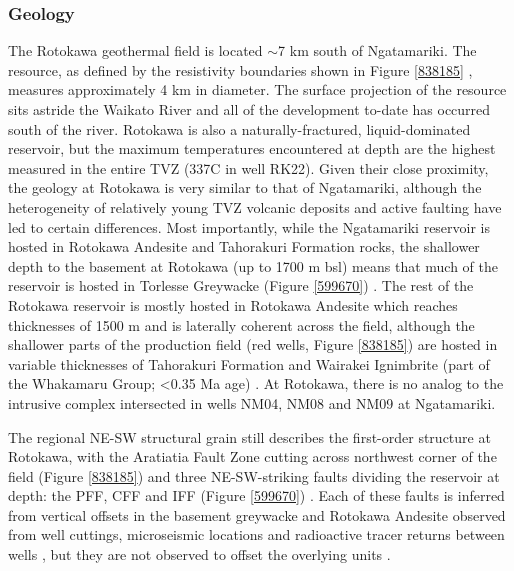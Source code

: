 \subsubsection{Geology}
The Rotokawa geothermal field is located $\sim$7 km south of Ngatamariki. The resource, as defined by the resistivity boundaries shown in Figure \ref{838185} \citep{Risk_2000}, measures approximately 4 km in diameter. The surface projection of the resource sits astride the Waikato River and all of the development to-date has occurred south of the river. Rotokawa is also a naturally-fractured, liquid-dominated reservoir, but the maximum temperatures encountered at depth are the highest measured in the entire TVZ (337\textdegree C in well RK22). Given their close proximity, the geology at Rotokawa is very similar to that of Ngatamariki, although the heterogeneity of relatively young TVZ volcanic deposits and active faulting have led to certain differences. Most importantly, while the Ngatamariki reservoir is hosted in Rotokawa Andesite and Tahorakuri Formation rocks, the shallower depth to the basement at Rotokawa (up to 1700 m bsl) means that much of the reservoir is hosted in Torlesse Greywacke (Figure \ref{599670}) \citep{wallis2013,McNamara_2016}. The rest of the Rotokawa reservoir is mostly hosted in Rotokawa Andesite which reaches thicknesses of 1500 m and is laterally coherent across the field, although the shallower parts of the production field (red wells, Figure \ref{838185}) are hosted in variable thicknesses of Tahorakuri Formation and Wairakei Ignimbrite (part of the Whakamaru Group; \textless0.35 Ma age) \citep{McNamara_2016}. At Rotokawa, there is no analog to the intrusive complex intersected in wells NM04, NM08 and NM09 at Ngatamariki.

The regional NE-SW structural grain still describes the first-order structure at Rotokawa, with the Aratiatia Fault Zone cutting across northwest corner of the field (Figure \ref{838185}) and three NE-SW-striking faults dividing the reservoir at depth: the \acrfull{PFF}, \acrfull{CFF} and \acrfull{IFF} (Figure \ref{599670}) \citep{wallis2013}. Each of these faults is inferred from vertical offsets in the basement greywacke and Rotokawa Andesite observed from well cuttings, microseismic locations and radioactive tracer returns between wells \citep{Sewell_2015,Addison_2017stanford,wallis2013}, but they are not observed to offset the overlying units \citep{wallis2013}.

